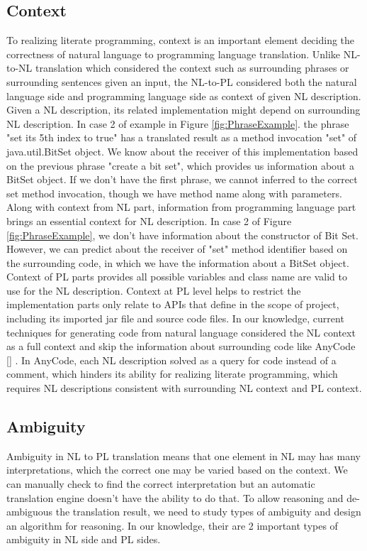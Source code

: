 \subsection{Context}
To realizing literate programming, context is an important element deciding the correctness of natural language to programming language translation. Unlike NL-to-NL translation which considered the context such as surrounding phrases or surrounding sentences given an input, the NL-to-PL considered both the natural language side and programming language side as context of given NL description. \\

Given a NL description, its related implementation might depend on surrounding NL description. In case 2 of example in Figure \ref{fig:PhraseExample}. the phrase "set its 5th index to true" has a translated result as a method invocation "set" of java.util.BitSet object. We know about the receiver of this implementation based on the previous phrase "create a bit set", which provides us information about a BitSet object. If we don't have the first phrase, we cannot inferred to the correct set method invocation, though we have method name along with parameters. \\

Along with context from NL part, information from programming language part brings an essential context for NL description. In case 2 of Figure  \ref{fig:PhraseExample}, we don't have information about the constructor of Bit Set. However, we can predict about the receiver of "set" method identifier based on the surrounding code, in which we have the information about a BitSet object. Context of PL parts provides all possible variables and class name are valid to use for the NL description. Context at PL level helps to restrict the implementation parts only relate to APIs that define in the scope of project, including its imported jar file and source code files. In our knowledge, current techniques for generating code from natural language considered the NL context as a full context and skip the information about surrounding code like AnyCode [\cite{Gvero:2015:SJE:2814270.2814295}] . In AnyCode, each NL description solved as a query for code instead of a comment, which hinders its ability for realizing literate programming, which requires NL descriptions consistent with surrounding NL context and PL context.

\subsection{Ambiguity}
Ambiguity in NL to PL translation means that one element in NL may has many interpretations, which the correct one may be varied based on the context. We can manually check to find the correct interpretation but an automatic translation engine doesn't have the ability to do that. To allow reasoning and de-ambiguous the translation result, we need to study types of ambiguity and design an algorithm for reasoning. In our knowledge, their are 2 important types of ambiguity in NL side and PL sides. \\

